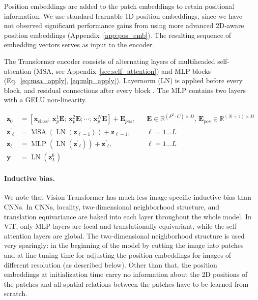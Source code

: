 Position embeddings are added to the patch embeddings to retain positional information. We use standard learnable 1D position embeddings, since we have not observed significant performance gains from using more advanced 2D-aware position embeddings  (Appendix~\ref{app:pos_emb}).
The resulting sequence of embedding vectors serves as input to the encoder.

The Transformer encoder \citep{vaswani2017} consists of alternating layers of multiheaded self-attention (MSA, see Appendix~\ref{sec:self_attention}) and MLP blocks (Eq.~\ref{eq:msa_apply}, \ref{eq:mlp_apply}).
Layernorm (LN) is applied before every block, and residual connections after every block \citep{wang2019-preLN,Baevski2019Adaptive}. The MLP contains two layers with a GELU non-linearity.

\begin{align}
    \mathbf{z}_0 &= [ \mathbf{x}_\text{class}; \, \mathbf{x}^1_p \mathbf{E}; \, \mathbf{x}^2_p \mathbf{E}; \cdots; \, \mathbf{x}^{N}_p \mathbf{E} ] + \mathbf{E}_{pos},
    && \mathbf{E} \in \mathbb{R}^{(P^2 \cdot C) \times D},\, \mathbf{E}_{pos}  \in \mathbb{R}^{(N + 1) \times D} \label{eq:embedding} \\
    \mathbf{z^\prime}_\ell &= \operatorname{MSA}(\operatorname{LN}(\mathbf{z}_{\ell-1})) + \mathbf{z}_{\ell-1}, && \ell=1\ldots L \label{eq:msa_apply} \\
    \mathbf{z}_\ell &= \operatorname{MLP}(\operatorname{LN}(\mathbf{z^\prime}_{\ell})) + \mathbf{z^\prime}_{\ell}, && \ell=1\ldots L  \label{eq:mlp_apply} \\
    \mathbf{y} &= \operatorname{LN}(\mathbf{z}_L^0) \label{eq:final_rep}
\end{align}

\paragraph{Inductive bias.} We note that Vision Transformer has much less image-specific inductive bias than CNNs. In CNNs, locality, two-dimensional neighborhood structure, and translation equivariance are baked into each layer throughout the whole model. In ViT, only MLP layers are local and translationally equivariant, while the self-attention layers are global. The two-dimensional neighborhood structure is used very sparingly: in the beginning of the model by cutting the image into patches and at fine-tuning time for adjusting the position embeddings for images of different resolution (as described below). Other than that, the position embeddings at initialization time carry no information about the 2D positions of the patches and all spatial relations between the patches have to be learned from scratch.

